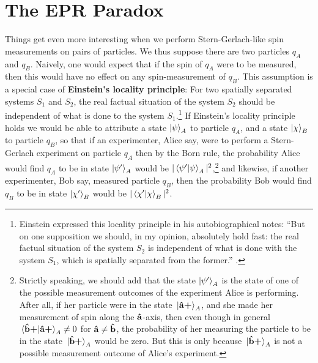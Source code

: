 \section{The EPR Paradox}
Things get even more interesting when we perform Stern-Gerlach-like spin measurements on pairs of particles. We thus suppose there are two particles $q_A$ and $q_B$. Naively, one would expect that if the spin of $q_A$ were to be measured, then this would have no effect on any spin-measurement of $q_B$. This assumption is a special case of \textbf{Einstein's locality principle}: For two spatially separated systems $S_1$ and $S_2$,  the real factual situation of the system $S_2$ should be independent of what is done to the system $S_1$.\footnote{Einstein expressed this locality principle in his autobiographical notes: ``But on one supposition we should, in my opinion, absolutely hold fast: the real factual situation of the system $S_2$ is independent of what is done with the system $S_1$, which is spatially separated from the former.'' \cite[p. 85]{EinsteinLocality}.} If Einstein's locality principle holds we would be able to attribute a state $\ket{\psi}_A$ to particle $q_A$, and a state $\ket{\chi}_B$ to particle $q_B$, so that if an experimenter, Alice say, were to perform a Stern-Gerlach experiment on particle $q_A$ then by the Born rule, the probability Alice would find $q_A$ to be in state $\ket{\psi'}_A$ would be $|\ip{\psi'}{\psi}_A|^2$,\footnote{Strictly speaking, we should add that the state $\ket{\psi'}_A$ is the state of one of the possible measurement outcomes of the experiment Alice is performing. After all, if her particle were in the state $\ket*{\vb{\hat{{a}}}\bm{+}}_A$, and she made her measurement of spin along the $\vb{\hat{{a}}}$-axis, then  even though in general $\ip*{\uvbp{b}}{\uvbp{a}}_A\neq 0$ for $\vb{\hat{{a}}}\neq\vb{\hat{{b}}}$, the probability of her measuring the particle to be in the state $\ket*{\vb{\hat{{b}}}\bm{+}}_A$ would be zero. But this is only because $\ket*{\vb{\hat{{b}}}\bm{+}}_A$ is not a possible measurement outcome of Alice's experiment.  } and likewise, if another  experimenter, Bob say, measured particle $q_B$, then the probability Bob would find $q_B$ to be in state $\ket{\chi'}_B$ would be $|\ip{\chi'}{\chi}_B|^2$. 

